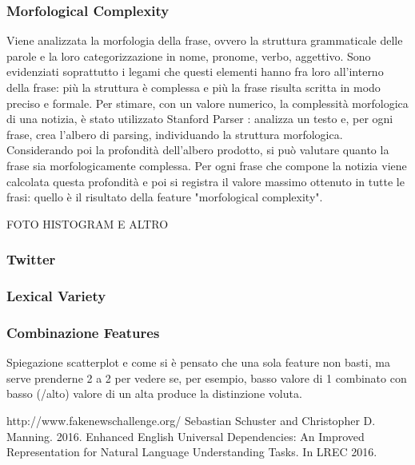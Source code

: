 \documentclass{article}
\begin{document}
\begin{multicols}{2}
				\subsubsection{Morfological Complexity}
					Viene analizzata la morfologia della frase, ovvero la struttura grammaticale delle parole e la loro categorizzazione in nome, pronome, verbo, aggettivo. Sono evidenziati soprattutto i legami che questi elementi hanno fra loro all'interno della frase: più la struttura è complessa e più la frase risulta scritta in modo preciso e formale. 
					Per stimare, con un valore numerico, la complessità morfologica di una notizia, è stato utilizzato Stanford Parser \cite{stanfordparser}: analizza un testo e, per ogni frase, crea l'albero di parsing, individuando la struttura morfologica. Considerando poi la profondità dell'albero prodotto, si può valutare quanto la frase sia morfologicamente complessa.
					Per ogni frase che compone la notizia viene calcolata questa profondità e poi si registra il valore massimo ottenuto in tutte le frasi: quello è il risultato della feature "morfological complexity".
					
					
					FOTO HISTOGRAM E ALTRO
					
				\subsubsection{Twitter}
				\subsubsection{Lexical Variety}
				
				\subsubsection{Combinazione Features}
				Spiegazione scatterplot e come si è pensato che una sola feature non basti, ma serve prenderne 2 a 2 per vedere se, per esempio, basso valore di 1 combinato con basso (/alto) valore di un alta produce la distinzione voluta.
	
	
	   	\end{multicols}		    
		\begin{thebibliography}{9}
				http://www.fakenewschallenge.org/
				 Sebastian Schuster and Christopher D. Manning. 2016. Enhanced English Universal Dependencies: An Improved Representation for Natural Language Understanding Tasks. In LREC 2016. 
		\end{thebibliography}
\end{document}
